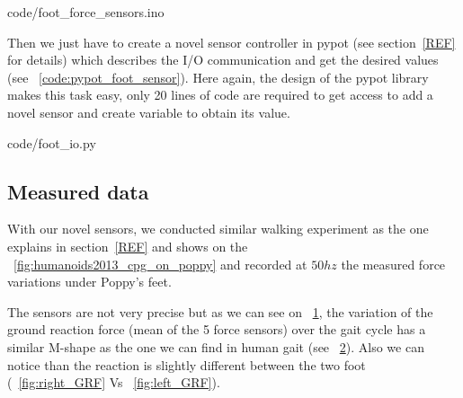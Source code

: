 
    {code/foot_force_sensors.ino}

Then we just have to create a novel sensor controller in pypot (see section~\ref{REF} for details) which describes the I/O communication and get the desired values (see \codename~\ref{code:pypot_foot_sensor}). Here again, the design of the pypot library makes this task easy, only 20 lines of code are required to get access to add a novel sensor and create variable to obtain its value.


    {code/foot_io.py}


\subsection{Measured data} %
With our novel sensors, we conducted similar walking experiment as the one explains in section~\ref{REF} and shows on the \figurename~\ref{fig:humanoids2013_cpg_on_poppy} and recorded at $50hz$ the measured force variations under Poppy's feet.

The sensors are not very precise but as we can see on \figurename~\ref{fig:poppy_GRF}, the variation of the ground reaction force (mean of the 5 force sensors) over the gait cycle has a similar M-shape as the one we can find in human gait (see \figurename~\ref{fig:human_GRF}). Also we can notice than the reaction is slightly different between the two foot (\figurename~\ref{fig:right_GRF} Vs \figurename~\ref{fig:left_GRF}).

\begin{figure}[!h]
\centering
    \hfil
    \caption{}
    \label{fig:poppy_GRF}
\end{figure}


\begin{figure}[!h]
\centering
    \hfil
    \caption{}
    \label{fig:human_GRF}
\end{figure}


